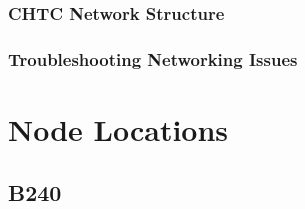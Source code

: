 \documentclass[10pt,letterpaper]{article}
\begin{document}
        \subsubsection{CHTC Network Structure}
        \subsubsection{Troubleshooting Networking Issues}

\clearpage


\appendix
\section{Node Locations}
    \subsection{B240}
\end{document}
